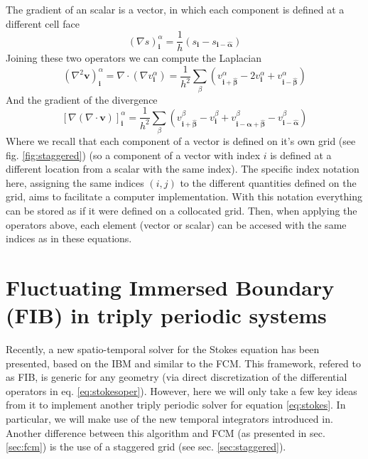 \documentclass[ twoside,openright,titlepage,numbers=noenddot,%
headinclude,footinclude,cleardoublepage=empty,abstract=on,
BCOR=5mm,paper=a4,fontsize=11pt, dvipsnames
]{scrreprt}
\renewcommand{\vec}[1]{\bm{#1}}
\begin{document}
The gradient of an scalar is a vector, in which each component is defined at a different cell face
\begin{equation}
  \label{eq:staggeredgrad}
  (\nabla s)^\alpha_{\vec{i}} = \frac{1}{h}(s_{\vec{i}} - s_{\vec{i}- \vec{\hat{\alpha}}})
\end{equation}
Joining these two operators we can compute the Laplacian
\begin{equation}
  (\nabla^2\vec{v})^\alpha_{\vec{i}} = \nabla\cdot(\nabla v_{\vec{i}}^\alpha) = \frac{1}{h^2}\sum_\beta\left(v^\alpha_{\vec{i} +\vec{\hat{\beta}}}  - 2v^\alpha_{\vec{i}} + v^\alpha_{\vec{i} -\vec{\hat{\beta}}} \right)
\end{equation}
And the gradient of the divergence
\begin{equation}
  \label{eq:staggeredlap}
\left[\nabla(\nabla\cdot \vec{v})\right]^\alpha_{\vec{i}} = \frac{1}{h^2}\sum_\beta\left(v^\beta_{\vec{i} +\vec{\hat{\beta}}}  - v^\beta_{\vec{i}} + v^\beta_{\vec{i} -\vec{\hat{\alpha}} + \vec{\hat{\beta}}} - v^\beta_{\vec{i} -\vec{\hat{\alpha}}}\right)
\end{equation}
Where we recall that each component of a vector is defined on it's own grid (see fig. \ref{fig:staggered}) (so a component of a vector with index $i$ is defined at a different location from a scalar with the same index). The specific index notation here, assigning the same indices $(i,j)$ to the different quantities defined on the grid, aims to facilitate a computer implementation. With this notation everything can be stored as if it were defined on a collocated grid. Then, when applying the operators above, each element (vector or scalar) can be accesed with the same indices as in these equations.



\section{Fluctuating Immersed Boundary (FIB) in triply periodic systems}\label{sec:fib}
Recently, a new spatio-temporal solver for the Stokes equation has been presented, based on the \gls{IBM} and similar to the \gls{FCM}\cite{Delong2014}. This framework, refered to as \gls{FIB}, is generic for any geometry (via direct discretization of the differential operators in eq. \eqref{eq:stokesoper}). However, here we will only take a few key ideas from it to implement another triply periodic solver for equation \eqref{eq:stokes}. In particular, we will make use of the new temporal integrators introduced in\cite{Delong2014}. Another difference between this algorithm and \gls{FCM} (as presented in sec. \ref{sec:fcm}) is the use of a staggered grid (see sec. \ref{sec:staggered}).
\end{document}
